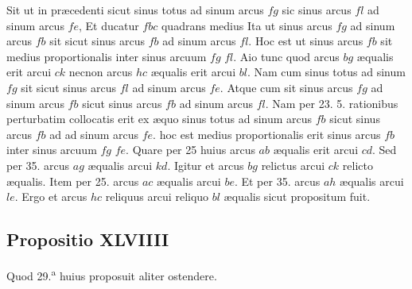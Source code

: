 \documentclass[11pt,a4paper]{article}
\begin{document}
Sit ut in præcedenti sicut sinus totus ad sinum arcus $fg$ sic sinus arcus $fl$ ad sinum arcus $fe$, Et ducatur $fbc$ quadrans medius Ita ut sinus arcus $fg$ ad sinum arcus $fb$ sit sicut sinus arcus $fb$ ad sinum arcus $fl$. Hoc est ut sinus arcus $fb$ sit medius proportionalis inter sinus arcuum $fg$ $fl$. Aio tunc quod arcus $bg$ æqualis erit arcui $ck$ necnon arcus $hc$ æqualis erit arcui $bl$. Nam cum sinus totus ad sinum $fg$ sit sicut sinus arcus $fl$ ad sinum arcus $fe$. Atque cum sit sinus arcus $fg$ ad sinum arcus $fb$ sicut sinus arcus $fb$ ad sinum arcus $fl$. Nam per 23. 5. rationibus perturbatim collocatis erit ex æquo sinus totus ad sinum arcus $fb$ sicut sinus arcus $fb$ ad ad sinum arcus $fe$. hoc est medius proportionalis erit sinus arcus $fb$ inter sinus arcuum $fg$ $fe$. Quare per 25 huius arcus $ab$ æqualis erit arcui $cd$. Sed per 35. arcus $ag$ æqualis arcui $kd$. Igitur et arcus $bg$ relictus arcui $ck$ relicto æqualis. Item per 25. arcus $ac$ æqualis arcui $be$. Et per 35. arcus $ah$ æqualis arcui $le$. Ergo et arcus $hc$ reliquus arcui reliquo $bl$ æqualis sicut propositum fuit.

\subsection*{Propositio XLVIIII}

Quod 29.\textsuperscript{a} huius proposuit aliter ostendere.
\end{document}
